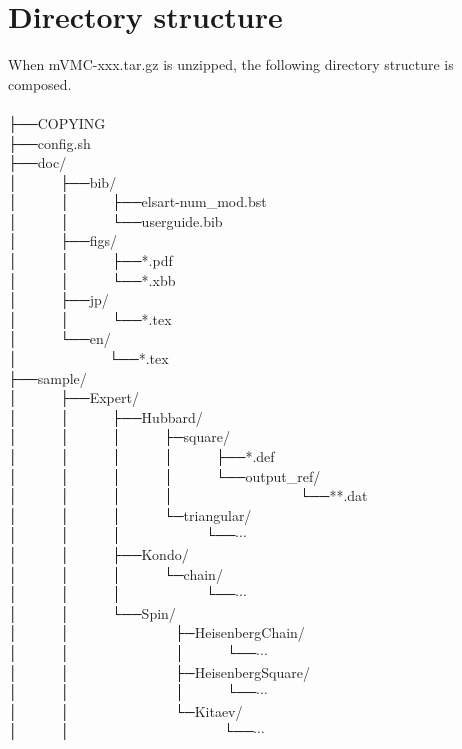 \label{Sec:HowToInstall}

\section{Directory structure}
When mVMC-xxx.tar.gz is unzipped, the following directory structure is composed.\\
\\
├──COPYING\\
├──config.sh\\
├──doc/\\
│~~~~~~├──bib/\\
│~~~~~~│~~~~~~├──elsart-num\_mod.bst\\
│~~~~~~│~~~~~~└──userguide.bib\\
│~~~~~~├──figs/\\
│~~~~~~│~~~~~~├──*.pdf\\
│~~~~~~│~~~~~~└──*.xbb\\
│~~~~~~├──jp/\\
│~~~~~~│~~~~~~└──*.tex\\
│~~~~~~└──en/\\
│~~~~~~~~~~~~~└──*.tex\\
├──sample/\\
│~~~~~~├──Expert/\\
│~~~~~~│~~~~~~├──Hubbard/\\
│~~~~~~│~~~~~~│~~~~~~├─square/\\
│~~~~~~│~~~~~~│~~~~~~│~~~~~~├──*.def\\
│~~~~~~│~~~~~~│~~~~~~│~~~~~~└──output\_ref/\\
│~~~~~~│~~~~~~│~~~~~~│~~~~~~~~~~~~~~~~~~└──**.dat\\
│~~~~~~│~~~~~~│~~~~~~└─triangular/\\
│~~~~~~│~~~~~~│~~~~~~~~~~~~└──$\cdots$\\
│~~~~~~│~~~~~~├──Kondo/\\
│~~~~~~│~~~~~~│~~~~~~└─chain/\\
│~~~~~~│~~~~~~│~~~~~~~~~~~~└──$\cdots$\\
│~~~~~~│~~~~~~└──Spin/\\
│~~~~~~│~~~~~~~~~~~~~~~├─HeisenbergChain/\\
│~~~~~~│~~~~~~~~~~~~~~~│~~~~~~└──$\cdots$\\
│~~~~~~│~~~~~~~~~~~~~~~├─HeisenbergSquare/\\
│~~~~~~│~~~~~~~~~~~~~~~│~~~~~~└──$\cdots$\\
│~~~~~~│~~~~~~~~~~~~~~~└─Kitaev/\\
│~~~~~~│~~~~~~~~~~~~~~~~~~~~~~└──$\cdots$\\
